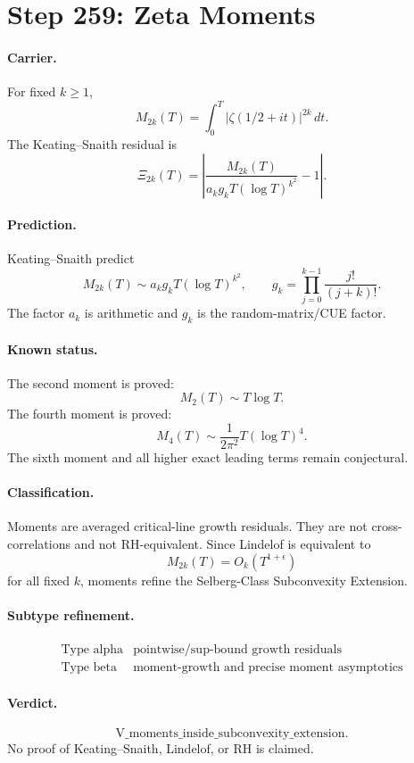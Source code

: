 \section*{Step 259: Zeta Moments}

\paragraph{Carrier.}
For fixed \(k\ge1\),
\[
M_{2k}(T)=\int_0^T |\zeta(1/2+it)|^{2k}\,dt.
\]
The Keating--Snaith residual is
\[
\Xi_{2k}(T)=
\left|
\frac{M_{2k}(T)}{a_k g_k T(\log T)^{k^2}}-1
\right|.
\]

\paragraph{Prediction.}
Keating--Snaith predict
\[
M_{2k}(T)\sim a_k g_k T(\log T)^{k^2},
\qquad
g_k=\prod_{j=0}^{k-1}\frac{j!}{(j+k)!}.
\]
The factor \(a_k\) is arithmetic and \(g_k\) is the random-matrix/CUE factor.

\paragraph{Known status.}
The second moment is proved:
\[
M_2(T)\sim T\log T.
\]
The fourth moment is proved:
\[
M_4(T)\sim \frac{1}{2\pi^2}T(\log T)^4.
\]
The sixth moment and all higher exact leading terms remain conjectural.

\paragraph{Classification.}
Moments are averaged critical-line growth residuals.  They are not
cross-correlations and not RH-equivalent.  Since Lindelof is equivalent to
\[
M_{2k}(T)=O_k(T^{1+\epsilon})
\]
for all fixed \(k\), moments refine the Selberg-Class Subconvexity Extension.

\paragraph{Subtype refinement.}
\[
\begin{array}{c|c}
\text{Type alpha} & \text{pointwise/sup-bound growth residuals}\\
\text{Type beta} & \text{moment-growth and precise moment asymptotics}
\end{array}
\]

\paragraph{Verdict.}
\[
\mathrm{V\_moments\_inside\_subconvexity\_extension}.
\]
No proof of Keating--Snaith, Lindelof, or RH is claimed.
